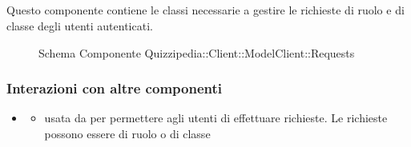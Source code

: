 \subsection{}
Questo componente contiene le classi necessarie a gestire le richieste di ruolo e di classe degli utenti autenticati.
\begin{figure}[H]
\centering
\noindent{}
\caption[Schema Componente Quizzipedia::Client::ModelClient::Requests]{Schema Componente Quizzipedia::Client::ModelClient::Requests}
\end{figure}
\subsubsection{Interazioni con altre componenti}
\begin{itemize}
\item {}
\begin{itemize}
\item usata da  per permettere agli utenti di effettuare richieste. Le richieste possono essere di ruolo o di classe
\end{itemize}
\end{itemize}
